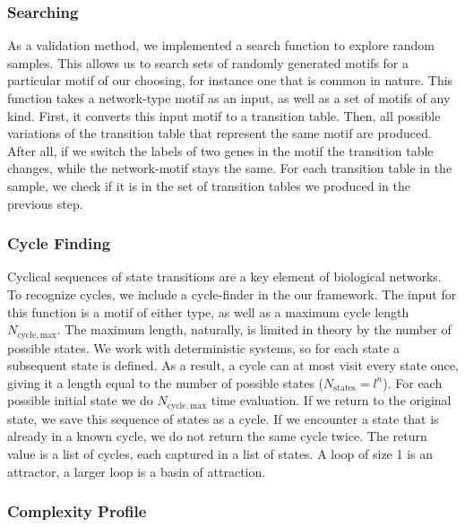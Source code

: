 \documentclass[../main.tex]{subfiles}
\begin{document}
\subsubsection{Searching}

As a validation method, we implemented a search function to explore random samples.
This allows us to search sets of randomly generated motifs for a particular motif of our choosing, for instance one that is common in nature.
This function takes a network-type motif as an input, as well as a set of motifs of any kind.
First, it converts this input motif to a transition table.
Then, all possible variations of the transition table that represent the same motif are produced.
After all, if we switch the labels of two genes in the motif the transition table changes, while the network-motif stays the same.
For each transition table in the sample, we check if it is in the set of transition tables we produced in the previous step.

\subsubsection{Cycle Finding}

Cyclical sequences of state transitions are a key element of biological networks. %
To recognize cycles, we include a cycle-finder in the our framework.
The input for this function is a motif of either type, as well as a maximum cycle length $N_\mathrm{cycle,max}$.
The maximum length, naturally, is limited in theory by the number of possible states.
We work with deterministic systems, so for each state a subsequent state is defined.
As a result, a cycle can at most visit every state once, giving it a length equal to the number of possible states ($N_\mathrm{states} = l^n$).
For each possible initial state we do $N_\mathrm{cycle,max}$ time evaluation.
If we return to the original state, we save this sequence of states as a cycle.
If we encounter a state that is already in a known cycle, we do not return the same cycle twice.
The return value is a list of cycles, each captured in a list of states.
A loop of size 1 is an attractor, a larger loop is a basin of attraction. %

\subsubsection{Complexity Profile}
\end{document}
